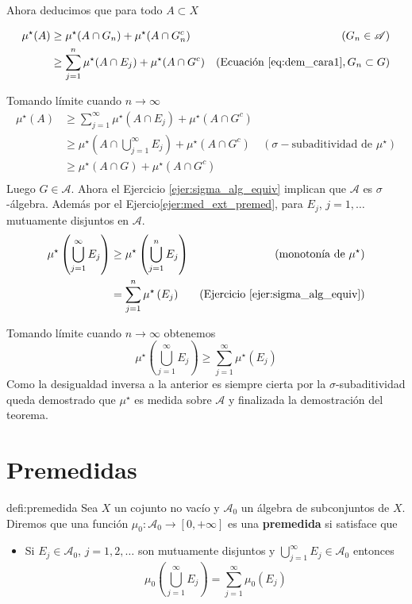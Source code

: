 \begin{demo}
Ahora deducimos que para todo $A\subset X$


\begin{align*}
\mu^\star( A)&\geq  \mu^\star(A\cap G_n)+ \mu^\star(A\cap G_n^c) & (G_n\in\mathscr{A})\\
& \geq \sum_{j=1}^n\mu^\star(A\cap E_j)+\mu^\star(A\cap G^c) & (\text{Ecuación \eqref{eq:dem_cara1}}, G_n\subset G)\\ 
\end{align*}

Tomando límite cuando $n\to\infty$
\begin{align*}
\mu^\star( A)&\geq  \sum_{j=1}^{\infty}\mu^\star(A\cap E_j)+\mu^\star(A\cap G^c) &  \\ 
             &\geq  \mu^\star\left(A\cap \bigcup_{j=1}^{\infty} E_j\right)+\mu^\star(A\cap G^c) & (\sigma-\text{subaditividad de } \mu^\star)  \\ 
             &\geq  \mu^\star\left(A\cap G \right)+\mu^\star(A\cap G^c) &   \\ 
\end{align*}
Luego $G\in\mathscr{A}$. Ahora el Ejercicio \ref{ejer:sigma_alg_equiv} implican que $\mathscr{A}$ es $\sigma$-álgebra. Además por el Ejercio\ref {ejer:med_ext_premed}, para $E_j$, $j=1,\ldots$ mutuamente disjuntos en $\mathscr{A}$.
\begin{align*}
 \mu^\star\left(\bigcup_{j=1}^{\infty} E_j\right) &\geq \mu^\star\left(\bigcup_{j=1}^{n} E_j\right) & (\text{monotonía de } \mu^\star)\\ 
 &= \sum_{j=1}^{n}  \mu^\star\left(E_j\right) & (\text{Ejercicio \ref{ejer:sigma_alg_equiv}}) \\ 
\end{align*}

Tomando límite cuando $n\to\infty$ obtenemos 
\[\mu^\star\left(\bigcup_{j=1}^{\infty} E_j\right) \geq \sum_{j=1}^{\infty}  \mu^\star\left(E_j\right)\]
Como la desigualdad inversa a la anterior es siempre cierta por la $\sigma$-subaditividad queda demostrado que $\mu^\star$ es medida sobre $\mathscr{A}$ y finalizada la demostración del teorema.   
 \end{demo}

\section{Premedidas}

\begin{definicion}[Premedida]{defi:premedida}
 Sea $X$ un cojunto no vacío y $\mathscr{A}_0$ un álgebra de subconjuntos de $X$. Diremos que una función $\mu_0: \mathscr{A}_0\to [0,+\infty]$ es una \textbf{premedida} si satisface que
 \begin{itemize}
  \item  Si $E_j\in\mathscr{A}_0$, $j=1,2,\ldots$ son mutuamente disjuntos y $\bigcup_{j=1}^{\infty}E_j\in\mathscr{A}_0$ entonces
  \[\mu_0\left(\bigcup_{j=1}^{\infty} E_j\right) = \sum_{j=1}^{\infty}  \mu_0\left(E_j\right)\]
\end{itemize}

  
 
\end{definicion}


